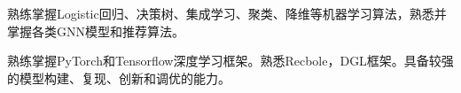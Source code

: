 


\begin{cventries}

  \cvintro
      {
        \begin{cvitems} %
          \item {熟练掌握Logistic回归、决策树、集成学习、聚类、降维等机器学习算法，熟悉并掌握各类GNN模型和推荐算法。}
          \item {熟练掌握PyTorch和Tensorflow深度学习框架。熟悉Recbole，DGL框架。具备较强的模型构建、复现、创新和调优的能力。}
        \end{cvitems}
      }

\end{cventries}
